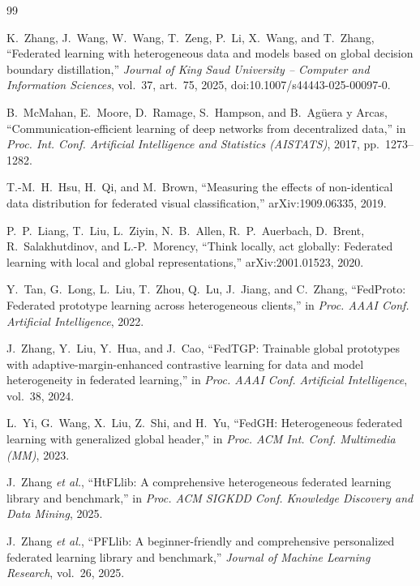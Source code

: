 \begin{thebibliography}{99}
\setlength{\itemsep}{0.25em}

K.~Zhang, J.~Wang, W.~Wang, T.~Zeng, P.~Li, X.~Wang, and T.~Zhang, ``Federated learning with heterogeneous data and models based on global decision boundary distillation,'' \emph{Journal of King Saud University -- Computer and Information Sciences}, vol.~37, art.~75, 2025, doi:10.1007/s44443-025-00097-0.

B.~McMahan, E.~Moore, D.~Ramage, S.~Hampson, and B.~Ag\"{u}era y Arcas, ``Communication-efficient learning of deep networks from decentralized data,'' in \emph{Proc. Int. Conf. Artificial Intelligence and Statistics (AISTATS)}, 2017, pp.~1273--1282.

T.-M.~H.~Hsu, H.~Qi, and M.~Brown, ``Measuring the effects of non-identical data distribution for federated visual classification,'' arXiv:1909.06335, 2019.

P.~P.~Liang, T.~Liu, L.~Ziyin, N.~B.~Allen, R.~P.~Auerbach, D.~Brent, R.~Salakhutdinov, and L.-P.~Morency, ``Think locally, act globally: Federated learning with local and global representations,'' arXiv:2001.01523, 2020.

Y.~Tan, G.~Long, L.~Liu, T.~Zhou, Q.~Lu, J.~Jiang, and C.~Zhang, ``FedProto: Federated prototype learning across heterogeneous clients,'' in \emph{Proc. AAAI Conf. Artificial Intelligence}, 2022.

J.~Zhang, Y.~Liu, Y.~Hua, and J.~Cao, ``FedTGP: Trainable global prototypes with adaptive-margin-enhanced contrastive learning for data and model heterogeneity in federated learning,'' in \emph{Proc. AAAI Conf. Artificial Intelligence}, vol.~38, 2024.

L.~Yi, G.~Wang, X.~Liu, Z.~Shi, and H.~Yu, ``FedGH: Heterogeneous federated learning with generalized global header,'' in \emph{Proc. ACM Int. Conf. Multimedia (MM)}, 2023.

J.~Zhang \emph{et al.}, ``HtFLlib: A comprehensive heterogeneous federated learning library and benchmark,'' in \emph{Proc. ACM SIGKDD Conf. Knowledge Discovery and Data Mining}, 2025.

J.~Zhang \emph{et al.}, ``PFLlib: A beginner-friendly and comprehensive personalized federated learning library and benchmark,'' \emph{Journal of Machine Learning Research}, vol.~26, 2025.


\end{thebibliography}
